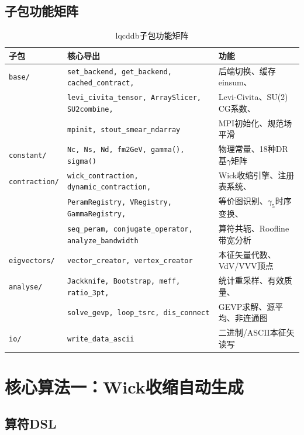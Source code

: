 \documentclass[11pt,a4paper]{ctexart}
\begin{document}
\subsection{子包功能矩阵}

\begin{table}[h]
\centering
\begin{tabular}{@{}lll@{}}
\toprule
子包 & 核心导出 & 功能 \\
\midrule
\texttt{base/} & \texttt{set\_backend, get\_backend, cached\_contract,} & 后端切换、缓存einsum、\\
               & \texttt{levi\_civita\_tensor, ArraySlicer, SU2combine,} & Levi-Civita、SU(2) CG系数、\\
               & \texttt{mpinit, stout\_smear\_ndarray} & MPI初始化、规范场平滑 \\
\texttt{constant/} & \texttt{Nc, Ns, Nd, fm2GeV, gamma(), sigma()} & 物理常量、18种DR基$\gamma$矩阵 \\
\texttt{contraction/} & \texttt{wick\_contraction, dynamic\_contraction,} & Wick收缩引擎、注册表系统、\\
               & \texttt{PeramRegistry, VRegistry, GammaRegistry,} & 等价图识别、$\gamma_5$时序变换、\\
               & \texttt{seq\_peram, conjugate\_operator, analyze\_bandwidth} & 算符共轭、Roofline带宽分析 \\
\texttt{eigvectors/} & \texttt{vector\_creator, vertex\_creator} & 本征矢量代数、VdV/VVV顶点 \\
\texttt{analyse/} & \texttt{Jackknife, Bootstrap, meff, ratio\_3pt,} & 统计重采样、有效质量、\\
               & \texttt{solve\_gevp, loop\_tsrc, dis\_connect} & GEVP求解、源平均、非连通图 \\
\texttt{io/} & \texttt{write\_data\_ascii} & 二进制/ASCII本征矢读写 \\
\bottomrule
\end{tabular}
\caption{lqcddb子包功能矩阵}
\end{table}

\section{核心算法一：Wick收缩自动生成}

\subsection{算符DSL}
\end{document}

